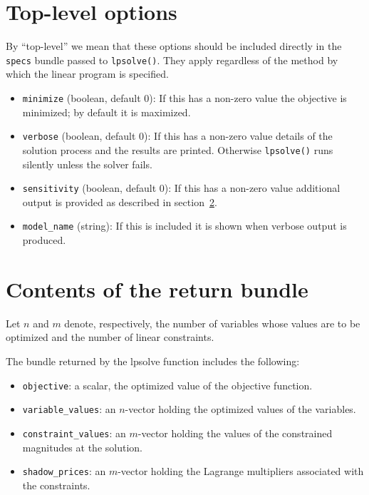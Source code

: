 \documentclass{article}
\begin{document}
\section{Top-level options}
\label{sec:gen-opts}

By ``top-level'' we mean that these options should be included
directly in the \texttt{specs} bundle passed to
\texttt{lpsolve()}. They apply regardless of the method by which the
linear program is specified.

\begin{itemize}
\item \texttt{minimize} (boolean, default 0): If this has a non-zero
  value the objective is minimized; by default it is maximized.  
\item \texttt{verbose} (boolean, default 0): If this has a non-zero
  value details of the solution process and the results are
  printed. Otherwise \texttt{lpsolve()} runs silently unless the
  solver fails.
\item \texttt{sensitivity} (boolean, default 0): If this has a
  non-zero value additional output is provided as described in
  section~\ref{sec:retval}.
\item \texttt{model\_name} (string): If this is included it is shown
  when verbose output is produced.
\end{itemize}

\section{Contents of the return bundle}
\label{sec:retval}

Let $n$ and $m$ denote, respectively, the number of variables whose
values are to be optimized and the number of linear constraints.

The bundle returned by the \textsf{lpsolve} function includes the
following:
\begin{itemize}
\item \texttt{objective}: a scalar, the optimized value of the objective
  function.
\item \texttt{variable\_values}: an $n$-vector holding the optimized
  values of the variables.
\item \texttt{constraint\_values}: an $m$-vector holding the values of
  the constrained magnitudes at the solution.
\item \texttt{shadow\_prices}: an $m$-vector holding the Lagrange
  multipliers associated with the constraints.
\end{itemize}
\end{document}
